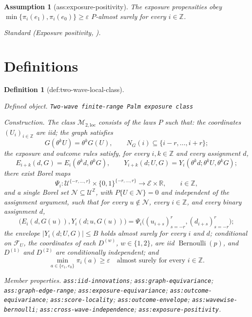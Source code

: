 \documentclass{article}
\newtheorem{assumption}{Assumption}
\newtheorem{definition}{Definition}
\begin{document}
\begin{assumption}[ass:exposure-positivity]\label{ass:exposure-positivity}
The exposure propensities obey \(\min\{\pi_i(e_1),\pi_i(e_0)\}\ge\varepsilon\) \(P\)-almost surely for every \(i\in\mathbb Z\).
\par\smallskip\noindent\emph{Standard} (Exposure positivity, \cite{AronowSamii2017}).
\end{assumption}

\section{Definitions}

\begin{definition}[def:two-wave-local-class]\label{def:two-wave-local-class}
\par\smallskip\noindent\emph{Defined object.} \texttt{Two-\allowbreak{}wave finite-\allowbreak{}range Palm exposure class}
\par\smallskip\noindent\emph{Construction.} The class \(\mathcal M_{2,\mathrm{loc}}\) consists of the laws \(P\) such that: the coordinates \((U_i)_{i\in\mathbb Z}\) are iid; the graph satisfies
\[
 G(\theta^kU)=\theta^kG(U),
 \qquad N_G(i)\subseteq\{i-r,\ldots,i+r\};
\]
the exposure and outcome rules satisfy, for every \(i,k\in\mathbb Z\) and every assignment \(d\),
\[
 E_{i+k}(d,G)=E_i(\theta^kd,\theta^kG),
 \qquad
 Y_{i+k}(d;U,G)=Y_i(\theta^kd;\theta^kU,\theta^kG);
\]
there exist Borel maps
\[
 \Psi_i:\mathcal U^{\{-r,\ldots,r\}}\times
 \{0,1\}^{\{-r,\ldots,r\}}\longrightarrow\mathcal E\times\mathbb R,
 \qquad i\in\mathbb Z,
\]
and a single Borel set \(\mathcal N\subseteq\mathcal U^{\mathbb Z}\), with \(P\{U\in\mathcal N\}=0\) and independent of the assignment argument, such that for every \(u\notin\mathcal N\), every \(i\in\mathbb Z\), and every binary assignment \(d\),
\[
 \bigl(E_i(d,G(u)),Y_i(d;u,G(u))\bigr)
 =\Psi_i\bigl((u_{i+s})_{s=-r}^{r},(d_{i+s})_{s=-r}^{r}\bigr);
\]
the envelope \(|Y_i(d;U,G)|\le B\) holds almost surely for every \(i\) and \(d\); conditional on \(\mathcal F_U\), the coordinates of each \(D^{(w)}\), \(w\in\{1,2\}\), are iid \(\operatorname{Bernoulli}(p)\), and \(D^{(1)}\) and \(D^{(2)}\) are conditionally independent; and
\[
 \min_{a\in\{e_1,e_0\}}\pi_i(a)\ge\varepsilon
 \quad\text{almost surely for every }i\in\mathbb Z.
\]
\par\smallskip\noindent\emph{Member properties.} \texttt{ass:\allowbreak{}iid-\allowbreak{}innovations}; \texttt{ass:\allowbreak{}graph-\allowbreak{}equivariance}; \texttt{ass:\allowbreak{}graph-\allowbreak{}edge-\allowbreak{}range}; \texttt{ass:\allowbreak{}exposure-\allowbreak{}equivariance}; \texttt{ass:\allowbreak{}outcome-\allowbreak{}equivariance}; \texttt{ass:\allowbreak{}score-\allowbreak{}locality}; \texttt{ass:\allowbreak{}outcome-\allowbreak{}envelope}; \texttt{ass:\allowbreak{}wavewise-\allowbreak{}bernoulli}; \texttt{ass:\allowbreak{}cross-\allowbreak{}wave-\allowbreak{}independence}; \texttt{ass:\allowbreak{}exposure-\allowbreak{}positivity}.
\end{definition}
\end{document}
